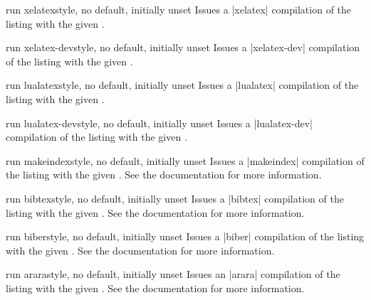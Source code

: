 \begin{docTcbKey}[][doc new=2014-11-14]{run xelatex}{}{style, no default, initially unset}
Issues a |xelatex| compilation of the listing with the given .
\end{docTcbKey}

\begin{docTcbKey}[][doc new=2025-05-20]{run xelatex-dev}{}{style, no default, initially unset}
Issues a |xelatex-dev| compilation of the listing with the given .
\end{docTcbKey}

\begin{docTcbKey}[][doc new=2014-11-14]{run lualatex}{}{style, no default, initially unset}
Issues a |lualatex| compilation of the listing with the given .
\end{docTcbKey}

\begin{docTcbKey}[][doc new=2025-05-20]{run lualatex-dev}{}{style, no default, initially unset}
Issues a |lualatex-dev| compilation of the listing with the given .
\end{docTcbKey}

\begin{docTcbKey}[][doc new=2014-11-14]{run makeindex}{}{style, no default, initially unset}
Issues a |makeindex| compilation of the listing with the given .
See the  documentation for more information.
\end{docTcbKey}

\begin{docTcbKey}[][doc new=2014-11-14]{run bibtex}{}{style, no default, initially unset}
Issues a |bibtex| compilation of the listing with the given .
See the  documentation for more information.
\end{docTcbKey}

\begin{docTcbKey}[][doc new=2014-11-14]{run biber}{}{style, no default, initially unset}
Issues a |biber| compilation of the listing with the given .
See the  documentation for more information.
\end{docTcbKey}

\begin{docTcbKey}[][doc new=2014-11-14]{run arara}{}{style, no default, initially unset}
Issues an |arara| compilation of the listing with the given .
See the  documentation for more information.
\end{docTcbKey}

